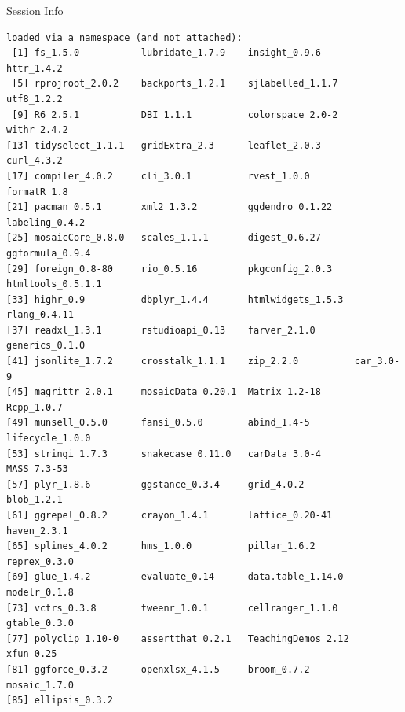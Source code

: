 \documentclass[10pt,handout]{beamer}\usepackage[]{graphicx}\usepackage[]{color}
\makeatletter
\newenvironment{kframe}{%
 \def\at@end@of@kframe{}%
 \ifinner\ifhmode%
  \def\at@end@of@kframe{\end{minipage}}%
  \begin{minipage}{\columnwidth}%
 \fi\fi%
 \def\FrameCommand##1{\hskip\@totalleftmargin \hskip-\fboxsep
 \colorbox{shadecolor}{##1}\hskip-\fboxsep
     \hskip-\linewidth \hskip-\@totalleftmargin \hskip\columnwidth}%
 \MakeFramed {\advance\hsize-\width
   \@totalleftmargin\z@ \linewidth\hsize
   \@setminipage}}%
 {\par\unskip\endMakeFramed%
 \at@end@of@kframe}
\newenvironment{knitrout}{}{} %
\makeatother
\begin{document}
\begin{frame}[fragile]{Session Info}
\begin{knitrout}
\begin{kframe}
\begin{verbatim}
loaded via a namespace (and not attached):
 [1] fs_1.5.0           lubridate_1.7.9    insight_0.9.6      httr_1.4.2        
 [5] rprojroot_2.0.2    backports_1.2.1    sjlabelled_1.1.7   utf8_1.2.2        
 [9] R6_2.5.1           DBI_1.1.1          colorspace_2.0-2   withr_2.4.2       
[13] tidyselect_1.1.1   gridExtra_2.3      leaflet_2.0.3      curl_4.3.2        
[17] compiler_4.0.2     cli_3.0.1          rvest_1.0.0        formatR_1.8       
[21] pacman_0.5.1       xml2_1.3.2         ggdendro_0.1.22    labeling_0.4.2    
[25] mosaicCore_0.8.0   scales_1.1.1       digest_0.6.27      ggformula_0.9.4   
[29] foreign_0.8-80     rio_0.5.16         pkgconfig_2.0.3    htmltools_0.5.1.1 
[33] highr_0.9          dbplyr_1.4.4       htmlwidgets_1.5.3  rlang_0.4.11      
[37] readxl_1.3.1       rstudioapi_0.13    farver_2.1.0       generics_0.1.0    
[41] jsonlite_1.7.2     crosstalk_1.1.1    zip_2.2.0          car_3.0-9         
[45] magrittr_2.0.1     mosaicData_0.20.1  Matrix_1.2-18      Rcpp_1.0.7        
[49] munsell_0.5.0      fansi_0.5.0        abind_1.4-5        lifecycle_1.0.0   
[53] stringi_1.7.3      snakecase_0.11.0   carData_3.0-4      MASS_7.3-53       
[57] plyr_1.8.6         ggstance_0.3.4     grid_4.0.2         blob_1.2.1        
[61] ggrepel_0.8.2      crayon_1.4.1       lattice_0.20-41    haven_2.3.1       
[65] splines_4.0.2      hms_1.0.0          pillar_1.6.2       reprex_0.3.0      
[69] glue_1.4.2         evaluate_0.14      data.table_1.14.0  modelr_0.1.8      
[73] vctrs_0.3.8        tweenr_1.0.1       cellranger_1.1.0   gtable_0.3.0      
[77] polyclip_1.10-0    assertthat_0.2.1   TeachingDemos_2.12 xfun_0.25         
[81] ggforce_0.3.2      openxlsx_4.1.5     broom_0.7.2        mosaic_1.7.0      
[85] ellipsis_0.3.2    
\end{verbatim}
\end{kframe}
\end{knitrout}
	
\end{frame}
\end{document}

